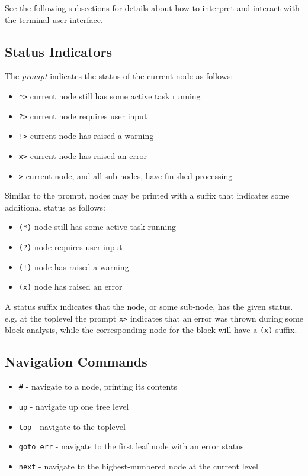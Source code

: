 See the following subsections for details about how to interpret and interact with the terminal user interface.

\subsection{Status Indicators}

The \emph{prompt} indicates the status of the current node as follows:
\begin{itemize}
\item \texttt{*>} current node still has some active task running
\item \texttt{?>} current node requires user input
\item \texttt{!>} current node has raised a warning
\item \texttt{x>} current node has raised an error
\item \texttt{>} current node, and all sub-nodes, have finished processing
\end{itemize}

Similar to the prompt, nodes may be printed with a suffix that indicates some additional status as follows:
\begin{itemize}
\item \texttt{(*)} node still has some active task running
\item \texttt{(?)} node requires user input
\item \texttt{(!)} node has raised a warning
\item \texttt{(x)} node has raised an error
\end{itemize}
A status suffix indicates that the node, or some sub-node, has the given status.
e.g. at the toplevel the prompt \texttt{x>} indicates that an error was thrown during some block analysis, while the corresponding node for the block will have a \texttt{(x)} suffix.

\subsection{Navigation Commands}

\begin{itemize}
\item \texttt{\#} - navigate to a node, printing its contents
\item \texttt{up} - navigate up one tree level
\item \texttt{top} - navigate to the toplevel
\item \texttt{goto\_err} - navigate to the first leaf node with an error status
\item \texttt{next} - navigate to the highest-numbered node at the current level
\end{itemize}


